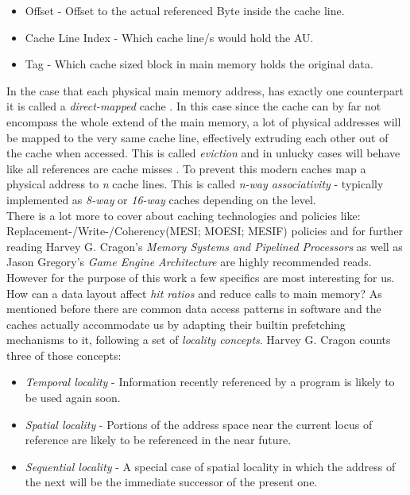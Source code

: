 \begin{itemize}
	\item Offset - Offset to the actual referenced Byte inside the cache line.
	\item Cache Line Index - Which cache line/s would hold the AU.
	\item Tag - Which cache sized block in main memory holds the original data.
\end{itemize}
In the case that each physical main memory address, has exactly one counterpart it is called a \textit{direct-mapped} cache . In this case since the cache can by far not encompass the whole extend of the main memory, a lot of physical addresses will be mapped to the very same cache line, effectively extruding each other out of the cache when accessed. This is called \textit{eviction} and in unlucky cases will behave like all references are cache misses . To prevent this modern caches map a physical address to \textit{n} cache lines. This is called \textit{n-way associativity} - typically implemented as \textit{8-way} or \textit{16-way} caches depending on the level.\\
There is a lot more to cover about caching technologies and policies like: Replacement-/Write-/Coherency(MESI; MOESI; MESIF) policies and for further reading Harvey G. Cragon's \textit{Memory Systems and Pipelined Processors} as well as Jason Gregory's \textit{Game Engine Architecture} are highly recommended reads. However for the purpose of this work a few specifics are most interesting for us.\\
How can a data layout affect \textit{hit ratios} and reduce calls to main memory? As mentioned before there are common data access patterns in software and the caches actually accommodate us by adapting their builtin prefetching mechanisms to it, following a set of \textit{locality concepts}. Harvey G. Cragon counts three of those concepts: 
\begin{itemize}
	\item \textit{Temporal locality} - Information recently referenced by a program is likely to be used again soon.
	\item \textit{Spatial locality} - Portions of the address space near the current locus of reference are likely to be referenced in the near future.
	\item \textit{Sequential locality} - A special case of spatial locality in which the address of the next will be the immediate successor of the present one.
\end{itemize}
